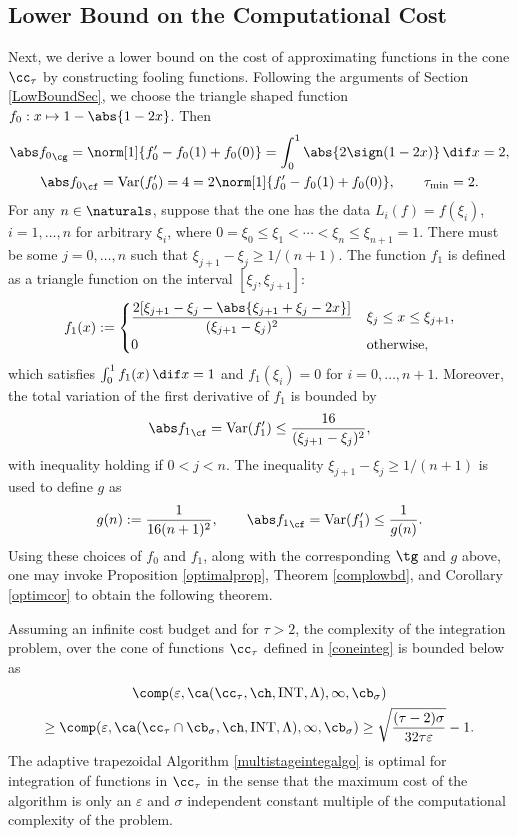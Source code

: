\subsection{Lower Bound on the Computational Cost}
Next, we derive a lower bound on the cost of approximating functions in the cone $\cc_{\tau}$ by constructing fooling functions. Following the arguments of Section \ref{LowBoundSec}, we choose  the triangle shaped function $f_0: x \mapsto 1-\abs{1-2x}$. Then
\begin{gather*}
\Gnorm{f_0}=\norm[1]{f'_0-f_0(1)+f_0(0)}=\int_0^1 \abs{2\sign(1-2x)} \, \dif x = 2, \\ \Fnorm{f_0}=\Var(f'_0)=4= 2 \norm[1]{f'_0-f_0(1)+f_0(0)}, \qquad \tau_{\min}=2.
\end{gather*}
For any $n \in \naturals$, suppose that the one has the data $L_i(f)=f(\xi_i)$, $i=1, \ldots, n$ for arbitrary $\xi_i$, where $0=\xi_0 \le \xi_1 < \cdots < \xi_n \le \xi_{n+1} = 1$.  There must be some $j=0, \ldots, n$ such that $\xi_{j+1} - \xi_j \ge 1/(n+1)$.  The function $f_{1}$ is defined as a triangle function on the interval $[\xi_j, \xi_{j+1}]$:
$$
f_{1}(x):=\begin{cases} \displaystyle
\frac{2[\xi_{j+1}-\xi_{j}-\abs{\xi_{j+1}+\xi_{j}-2x}]}{(\xi_{j+1}-\xi_{j})^2} & \xi_{j} \le x \leq \xi_{j+1},\\
0 & \text{otherwise},
\end{cases}
$$
which satisfies $\int_0^1 f_1(x) \, \dif x=1$ and $f_1(\xi_i)=0$ for $i=0, \ldots, n+1$.  Moreover, the total variation of the first derivative of $f_1$ is bounded by
\begin{equation*}
\Fnorm{f_1}=\Var(f'_1)\le\frac{16}{(\xi_{j+1}-\xi_{j})^2},
\end{equation*}
with inequality holding if $0 < j < n$.  The inequality $\xi_{j+1} - \xi_j \ge 1/(n+1)$ is used to define $g$ as
\[
g(n) := \frac{1}{16(n+1)^2}, \qquad \Fnorm{f_1}=\Var(f'_1) \le \frac{1}{g(n)}.
\]
Using these choices of $f_0$ and $f_1$, along with the corresponding $\tg$ and $g$ above, one may invoke Proposition \ref{optimalprop}, Theorem \ref{complowbd}, and Corollary \ref{optimcor} to obtain the following theorem.

\begin{theorem} \label{complowbdinteg} Assuming an infinite cost budget and for $\tau>2$, the complexity of the integration problem, over the cone of functions $\cc_{\tau}$ defined in \eqref{coneinteg} is bounded below as
\begin{multline*}
\comp(\varepsilon,\ca(\cc_{\tau},\ch,\INT,\Lambda),\infty,\cb_{\sigma}) \\ \ge \comp(\varepsilon,\ca(\cc_{\tau}\cap \cb_{\sigma},\ch,\INT,\Lambda),\infty,\cb_{\sigma})
\ge \sqrt{\frac{(\tau-2)\sigma}{32 \tau \varepsilon}} -1 .
\end{multline*}
The adaptive trapezoidal Algorithm \ref{multistageintegalgo} is optimal for integration of functions in $\cc_{\tau}$ in the sense that the maximum cost of the algorithm is only an $\varepsilon$ and $\sigma$ independent constant multiple of the computational complexity of the problem. 
\end{theorem}

